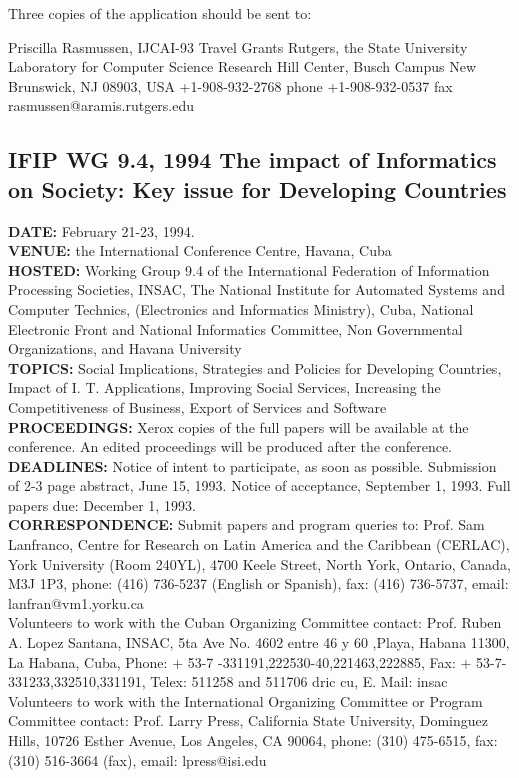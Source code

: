 Three copies of the application should be sent to:

	Priscilla Rasmussen, IJCAI-93 Travel Grants
	Rutgers, the State University
	Laboratory for Computer Science Research
	Hill Center, Busch Campus
	New Brunswick, NJ 08903, USA
	+1-908-932-2768 phone
	+1-908-932-0537 fax
	rasmussen@aramis.rutgers.edu


\subsection{IFIP WG 9.4, 1994 The impact of Informatics on Society:
Key issue for Developing Countries}

{\bf DATE:} February 21-23, 1994.\\
{\bf VENUE:} the International Conference Centre, Havana, Cuba\\
{\bf HOSTED:}
   Working Group 9.4 of the International Federation of 
   Information Processing Societies,
   INSAC, The National Institute for Automated Systems and Computer 
   Technics, (Electronics and Informatics Ministry), Cuba,
   National Electronic Front and National Informatics Committee, 
   Non Governmental Organizations, and Havana University\\
{\bf TOPICS:}
   Social Implications,
   Strategies and Policies for Developing Countries,
   Impact of I. T. Applications,
   Improving Social Services,
   Increasing the Competitiveness of Business,
   Export of Services and Software
{\bf PROCEEDINGS:}   Xerox copies of the full papers will be available at the 
   conference.  An edited proceedings will be produced after the 
   conference.\\
{\bf DEADLINES:} Notice of intent to participate, as soon as possible.
   Submission of 2-3 page abstract, June 15, 1993.
   Notice of acceptance, September 1, 1993.
   Full papers due: December 1, 1993.\\
{\bf CORRESPONDENCE:}
Submit papers and program queries to:
   Prof. Sam Lanfranco,
   Centre for Research on Latin America and the Caribbean (CERLAC),
   York University (Room 240YL),
   4700 Keele Street, North York,
   Ontario, Canada, M3J 1P3,
   phone: (416) 736-5237 (English or Spanish),
   fax:   (416) 736-5737,
   email: lanfran@vm1.yorku.ca\\
Volunteers to work with the Cuban Organizing Committee contact:
   Prof. Ruben A. Lopez Santana,
   INSAC,
   5ta Ave No. 4602 entre 46 y 60 ,Playa, Habana 11300, La Habana, Cuba,
   Phone: + 53-7 -331191,222530-40,221463,222885,
   Fax: + 53-7-331233,332510,331191,
   Telex:  511258 and 511706 dric cu,
   E. Mail: insac%
Volunteers to work with the International Organizing Committee or 
Program Committee contact:
   Prof. Larry Press,
   California State University, Dominguez Hills,
   10726 Esther Avenue,
   Los Angeles, CA  90064,
   phone: (310) 475-6515,
   fax:   (310) 516-3664 (fax),
   email: lpress@isi.edu

